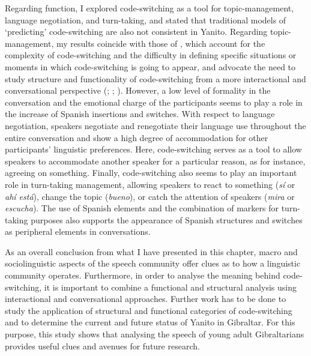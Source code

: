\documentclass[output=paper]{langscibook}
\begin{document}
\largerpage
Regarding function, I explored code-switching as a tool for topic-management, language negotiation, and turn-taking, and stated that traditional models of ‘predicting’ code-switching are also not consistent in Yanito. Regarding topic-man\-age\-ment, my results coincide with those of \citet{milroy_pragmatics_1995}, which account for the complexity of code-switching and the difficulty in defining specific situations or moments in which code-switching is going to appear, and advocate the need to study structure and functionality of code-switching from a more interactional and conversational perspective
(\citealt{weston_code-switching_2013}; \citealt{goria_functional_2017}; \citeyear{goria_complex_2021}). However, a low level of formality in the conversation and the emotional charge of the participants seems to play a role in the increase of Spanish insertions and switches. With respect to language negotiation, speakers negotiate and renegotiate their language use throughout the entire conversation and show a high degree of accommodation for other participants’ linguistic preferences. Here, code-switching serves as a tool to allow speakers to accommodate another speaker for a particular reason, as for instance, agreeing on something. Finally, code-switching also seems to play an important role in turn-taking management, allowing speakers to react to something (\textit{sí} or \textit{ahí está}), change the topic (\textit{bueno}), or catch the attention of speakers (\textit{mira} or \textit{escucha}). The use of Spanish elements and the combination of markers for turn-taking purposes also supports the appearance of Spanish structures and switches as peripheral elements in conversations. 

As an overall conclusion from what I have presented in this chapter, macro and sociolinguistic aspects of the speech community offer clues as to how a linguistic community operates. Furthermore, in order to analyse the meaning behind code-switching, it is important to combine a functional and structural analysis using interactional and conversational approaches. Further work has to be done to study the application of structural and functional categories of code-switching and to determine the current and future status of Yanito in Gibraltar. For this purpose, this study shows that analysing the speech of young adult Gibraltarians provides useful clues and avenues for future research. 
\end{document}
